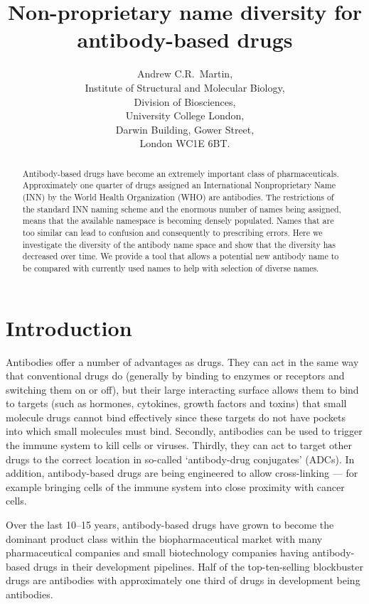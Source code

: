 \documentclass{article}
\title{Non-proprietary name diversity for antibody-based drugs}
\author{Andrew C.R.\ Martin,\\Institute of Structural and Molecular
  Biology,\\Division of Biosciences,\\University College
  London,\\Darwin Building, Gower Street,\\London WC1E 6BT.}
\begin{document}
\maketitle

\begin{abstract}
Antibody-based drugs have become an extremely important class of
pharmaceuticals. Approximately one quarter of drugs assigned an
International Nonproprietary Name (INN) by the World Health
Organization (WHO) are antibodies.  The restrictions of the standard
INN naming scheme and the enormous number of names being assigned,
means that the available namespace is becoming densely populated.
Names that are too similar can lead to confusion and consequently to
prescribing errors. Here we investigate the diversity of the antibody
name space and show that the diversity has decreased over time. We
provide a tool that allows a potential new antibody name to be
compared with currently used names to help with selection of diverse
names.
\end{abstract}

\section{Introduction}
Antibodies offer a number of advantages as drugs. They can act in the
same way that conventional drugs do (generally by binding to enzymes
or receptors and switching them on or off), but their large
interacting surface allows them to bind to targets (such as hormones,
cytokines, growth factors and toxins) that small molecule drugs cannot
bind effectively since these targets do not have pockets into which small
molecules must bind. Secondly, antibodies can be used to trigger the
immune system to kill cells or viruses. Thirdly, they can act to
target other drugs to the correct location in so-called `antibody-drug
conjugates' (ADCs). In addition, antibody-based drugs are being
engineered to allow cross-linking --- for example bringing cells of
the immune system into close proximity with cancer cells.

Over the last 10--15 years, antibody-based drugs have grown to become
the dominant product class within the biopharmaceutical
market\cite{ecker:abmarket} with many pharmaceutical companies and
small biotechnology companies having antibody-based drugs in their
development pipelines. Half of the top-ten-selling blockbuster drugs
are antibodies\cite{igea:top10:2018} with approximately one third of
drugs in development being antibodies\cite{reichert:trends}.
\end{document}

